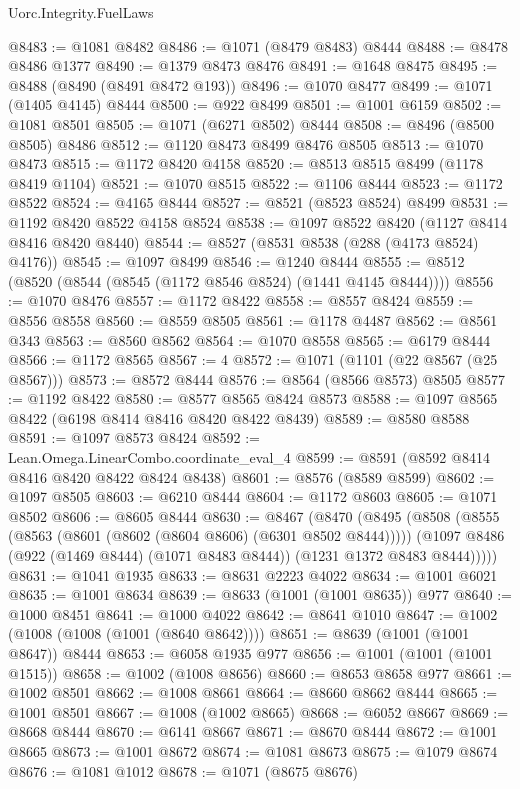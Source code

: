 \begin{lexlean}{Uorc.Integrity.FuelLaws}
\begin{coremodule}
@8483 := @1081 @8482
@8486 := @1071 (@8479 @8483) @8444
@8488 := @8478 @8486 @1377
@8490 := @1379 @8473 @8476
@8491 := @1648 @8475
@8495 := @8488 (@8490 (@8491 @8472 @193))
@8496 := @1070 @8477
@8499 := @1071 (@1405 @4145) @8444
@8500 := @922 @8499
@8501 := @1001 @6159
@8502 := @1081 @8501
@8505 := @1071 (@6271 @8502) @8444
@8508 := @8496 (@8500 @8505) @8486
@8512 := @1120 @8473 @8499 @8476 @8505
@8513 := @1070 @8473
@8515 := @1172 @8420 @4158
@8520 := @8513 @8515 @8499 (@1178 @8419 @1104)
@8521 := @1070 @8515
@8522 := @1106 @8444
@8523 := @1172 @8522
@8524 := @4165 @8444
@8527 := @8521 (@8523 @8524) @8499
@8531 := @1192 @8420 @8522 @4158 @8524
@8538 := @1097 @8522 @8420 (@1127 @8414 @8416 @8420 @8440)
@8544 := @8527 (@8531 @8538 (@288 (@4173 @8524) @4176))
@8545 := @1097 @8499
@8546 := @1240 @8444
@8555 := @8512 (@8520 (@8544 (@8545 (@1172 @8546 @8524) (@1441 @4145 @8444))))
@8556 := @1070 @8476
@8557 := @1172 @8422
@8558 := @8557 @8424
@8559 := @8556 @8558
@8560 := @8559 @8505
@8561 := @1178 @4487
@8562 := @8561 @343
@8563 := @8560 @8562
@8564 := @1070 @8558
@8565 := @6179 @8444
@8566 := @1172 @8565
@8567 := 4
@8572 := @1071 (@1101 (@22 @8567 (@25 @8567)))
@8573 := @8572 @8444
@8576 := @8564 (@8566 @8573) @8505
@8577 := @1192 @8422
@8580 := @8577 @8565 @8424 @8573
@8588 := @1097 @8565 @8422 (@6198 @8414 @8416 @8420 @8422 @8439)
@8589 := @8580 @8588
@8591 := @1097 @8573 @8424
@8592 := Lean.Omega.LinearCombo.coordinate_eval_4
@8599 := @8591 (@8592 @8414 @8416 @8420 @8422 @8424 @8438)
@8601 := @8576 (@8589 @8599)
@8602 := @1097 @8505
@8603 := @6210 @8444
@8604 := @1172 @8603
@8605 := @1071 @8502
@8606 := @8605 @8444
@8630 := @8467
    (@8470
      (@8495
        (@8508
          (@8555 (@8563 (@8601 (@8602 (@8604 @8606) (@6301 @8502 @8444)))))
          (@1097 @8486 (@922 (@1469 @8444) (@1071 @8483 @8444)) (@1231 @1372 @8483 @8444)))))
@8631 := @1041 @1935
@8633 := @8631 @2223 @4022
@8634 := @1001 @6021
@8635 := @1001 @8634
@8639 := @8633 (@1001 (@1001 @8635)) @977
@8640 := @1000 @8451
@8641 := @1000 @4022
@8642 := @8641 @1010
@8647 := @1002 (@1008 (@1008 (@1001 (@8640 @8642))))
@8651 := @8639 (@1001 (@1001 @8647)) @8444
@8653 := @6058 @1935 @977
@8656 := @1001 (@1001 (@1001 @1515))
@8658 := @1002 (@1008 @8656)
@8660 := @8653 @8658 @977
@8661 := @1002 @8501
@8662 := @1008 @8661
@8664 := @8660 @8662 @8444
@8665 := @1001 @8501
@8667 := @1008 (@1002 @8665)
@8668 := @6052 @8667
@8669 := @8668 @8444
@8670 := @6141 @8667
@8671 := @8670 @8444
@8672 := @1001 @8665
@8673 := @1001 @8672
@8674 := @1081 @8673
@8675 := @1079 @8674
@8676 := @1081 @1012
@8678 := @1071 (@8675 @8676)

\end{coremodule}
\end{lexlean}
